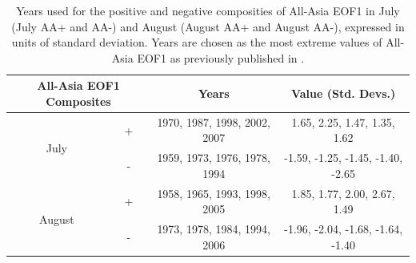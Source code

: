 \begin{table}[p]

\caption{Years used for the positive and negative composities of All-Asia EOF1 in July (July AA+ and AA-) and August (August AA+ and August AA-), expressed in units of standard deviation. Years are chosen as the most extreme values of All-Asia EOF1 as previously published in \citet{Day2015}.}
\centering

\begin{tabular}{ c c c c}
	 	 		\multicolumn{2}{c}{All-Asia EOF1 Composites} 	&			Years				&		Value (Std. Devs.)			\tabularnewline	
				\hline
	 \multirow{2}{*}{July} 		&  +							&	1970, 1987, 1998, 2002, 2007 	&	1.65, 2.25, 1.47, 1.35, 1.62		\tabularnewline
	 						&  -							&	1959, 1973, 1976, 1978, 1994       &	-1.59, -1.25, -1.45, -1.40, -2.65	\tabularnewline
	 \multirow{2}{*}{August}	&  + 							&	1958, 1965, 1993, 1998, 2005	&	1.85, 1.77, 2.00, 2.67, 1.49		\tabularnewline
	 						&  -  							&	1973, 1978, 1984, 1994, 2006	&	-1.96, -2.04, -1.68, -1.64, -1.40 	\tabularnewline

\end{tabular}
\label{tab:t41}
\end{table}

%
%
%
%

